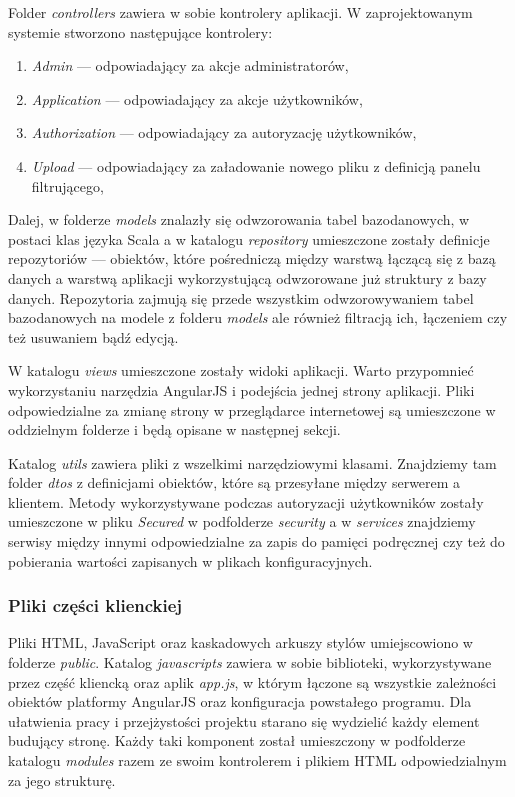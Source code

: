 \documentclass[a4paper,12pt,twoside]{article}
\begin{document}
Folder \textit{controllers} zawiera w sobie kontrolery aplikacji.
W zaprojektowanym systemie stworzono następujące kontrolery:
\begin{enumerate}[1)]
\item \textit{Admin} — odpowiadający za akcje administratorów,
\item \textit{Application} — odpowiadający za akcje użytkowników,
\item \textit{Authorization} — odpowiadający za autoryzację użytkowników,
\item \textit{Upload} — odpowiadający za załadowanie nowego pliku z definicją panelu filtrującego,
\end{enumerate}

Dalej, w folderze \textit{models} znalazły się odwzorowania tabel bazodanowych,
w postaci klas języka Scala a w katalogu \textit{repository} umieszczone
zostały definicje repozytoriów — obiektów, które pośredniczą
między warstwą łączącą się z bazą danych a warstwą aplikacji
wykorzystującą odwzorowane już struktury z bazy danych.
Repozytoria zajmują się przede wszystkim odwzorowywaniem tabel bazodanowych na
modele z folderu \textit{models} ale również filtracją ich, łączeniem
czy też usuwaniem bądź edycją.

W katalogu \textit{views} umieszczone zostały widoki aplikacji.
Warto przypomnieć wykorzystaniu narzędzia AngularJS
i podejścia jednej strony aplikacji. Pliki odpowiedzialne
za zmianę strony w przeglądarce internetowej są umieszczone
w oddzielnym folderze i będą opisane w następnej sekcji.

Katalog \textit{utils} zawiera pliki z wszelkimi narzędziowymi
klasami. Znajdziemy tam folder \textit{dtos} z definicjami obiektów,
które są przesyłane między serwerem a klientem.
Metody wykorzystywane podczas autoryzacji użytkowników zostały umieszczone w pliku \textit{Secured} w podfolderze \textit{security} a w \textit{services} znajdziemy
serwisy między innymi odpowiedzialne za zapis do pamięci podręcznej czy też
do pobierania wartości zapisanych w plikach konfiguracyjnych.

\newpage
\subsubsection{Pliki części klienckiej}

Pliki HTML, JavaScript oraz kaskadowych arkuszy stylów umiejscowiono
w folderze \textit{public}.
Katalog \textit{javascripts} zawiera w sobie biblioteki, wykorzystywane przez
część kliencką oraz aplik \textit{app.js}, w którym łączone są wszystkie
zależności obiektów platformy AngularJS oraz konfiguracja powstałego programu.
Dla ułatwienia pracy i przejżystości projektu starano się wydzielić każdy element budujący stronę. Każdy taki komponent został umieszczony w podfolderze
katalogu \textit{modules} razem ze swoim kontrolerem i plikiem HTML odpowiedzialnym
za jego strukturę.
\end{document}
